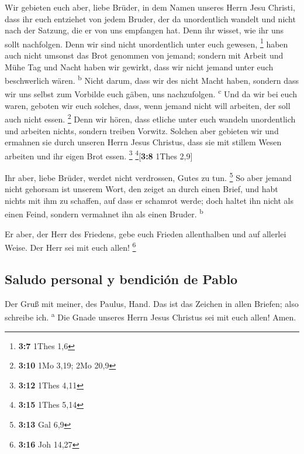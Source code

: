  Wir gebieten euch aber, liebe Brüder, in dem Namen
unseres Herrn Jesu Christi, dass ihr euch entziehet von jedem Bruder,
der da unordentlich wandelt und nicht nach der Satzung, die er von uns
empfangen hat.  Denn ihr wisset, wie ihr uns sollt
nachfolgen. Denn wir sind nicht unordentlich unter euch gewesen,
\footnote{\textbf{3:7} 1Thes 1,6}  haben auch nicht
umsonst das Brot genommen von jemand; sondern mit Arbeit und Mühe Tag
und Nacht haben wir gewirkt, dass wir nicht jemand unter euch
beschwerlich wären. \textsuperscript{b}  Nicht darum, dass
wir des nicht Macht haben, sondern dass wir uns selbst zum Vorbilde euch
gäben, uns nachzufolgen. \textsuperscript{c}  Und da wir
bei euch waren, geboten wir euch solches, dass, wenn jemand nicht will
arbeiten, der soll auch nicht essen. \footnote{\textbf{3:10} 1Mo 3,19;
  2Mo 20,9}  Denn wir hören, dass etliche unter euch
wandeln unordentlich und arbeiten nichts, sondern treiben Vorwitz.
 Solchen aber gebieten wir und ermahnen sie durch unseren
Herrn Jesus Christus, dass sie mit stillem Wesen arbeiten und ihr eigen
Brot essen. \footnote{\textbf{3:12} 1Thes 4,11}
\footnote{\textbf{3:15} 1Thes 5,14}{[}\textbf{3:8} 1Thes 2,9{]}

 Ihr aber, liebe Brüder, werdet nicht verdrossen, Gutes
zu tun. \footnote{\textbf{3:13} Gal 6,9}  So aber jemand
nicht gehorsam ist unserem Wort, den zeiget an durch einen Brief, und
habt nichts mit ihm zu schaffen, auf dass er schamrot werde;
 doch haltet ihn nicht als einen Feind, sondern vermahnet
ihn als einen Bruder. \textsuperscript{b}

 Er aber, der Herr des Friedens, gebe euch Frieden
allenthalben und auf allerlei Weise. Der Herr sei mit euch allen!
\footnote{\textbf{3:16} Joh 14,27}

\hypertarget{saludo-personal-y-bendiciuxf3n-de-pablo}{%
\subsection{Saludo personal y bendición de
Pablo}\label{saludo-personal-y-bendiciuxf3n-de-pablo}}

 Der Gruß mit meiner, des Paulus, Hand. Das ist das
Zeichen in allen Briefen; also schreibe ich. \textsuperscript{a}
 Die Gnade unseres Herrn Jesus Christus sei mit euch
allen! Amen.
